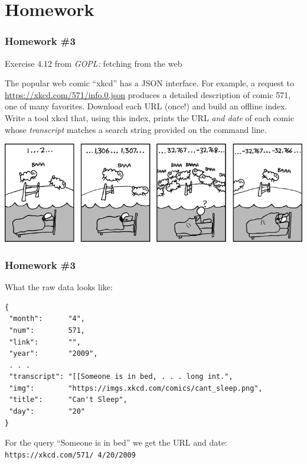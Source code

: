 \documentclass[handout,compress,t,11pt]{beamer}
\begin{document}

\section{Homework}
\begin{frame}[fragile]
    \frametitle{Homework \#3}
    Exercise 4.12 from {\em GOPL:} fetching from the web \par
    \vspace{0.4\baselineskip}
{\small {} The popular web comic ``xkcd'' has a JSON interface. 
For example, a request to 
\href{https://xkcd.com/571/info.0.json}{https://xkcd.com/571/info.0.json}
produces a detailed description of comic 571, one of many favorites. Download 
each URL (once!) and build an offline index. Write a tool xkcd that, using this 
index, prints the URL {\em and date} of each comic whose {\em transcript} 
matches a search string provided on the command line. \\}
\begin{center}
\includegraphics[width=.6\textwidth]{cant_sleep.png}
\end{center}
\end{frame}
\begin{frame}[fragile]
    \frametitle{Homework \#3}
    What the raw data looks like:
{\small
\begin{verbatim}
{
 "month":      "4", 
 "num":        571, 
 "link":       "", 
 "year":       "2009", 
 . . . 
 "transcript": "[[Someone is in bed, . . . long int.", 
 "img":        "https://imgs.xkcd.com/comics/cant_sleep.png", 
 "title":      "Can't Sleep",
 "day":        "20"
}
\end{verbatim}}
For the query ``Someone is in bed'' we get the URL and date: 
\verb|https://xkcd.com/571/ 4/20/2009|
\end{frame}
\end{document}
